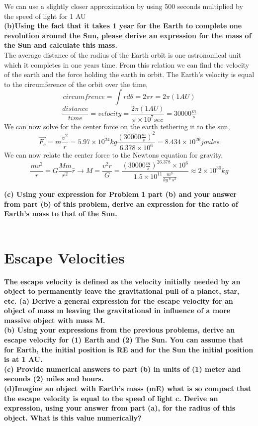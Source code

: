 \documentclass[paper=a4, fontsize=11pt]{scrartcl} %
\numberwithin{equation}{section} %
\numberwithin{figure}{section} %
\numberwithin{table}{section} %
\begin{document}
We can use a slightly closer approximation by using 500 seconds multiplied by the speed of light for 1 AU\\

\textbf{(b)Using the fact that it takes 1 year for the Earth to complete one revolution around
the Sun, please derive an expression for the mass of the Sun and calculate this mass.}\\

The average distance of the radius of the Earth orbit is one astronomical unit which it completes in one years time. From this relation we can find the velocity of the earth and the force holding the earth in orbit.
The Earth's velocity is equal to the circumference of the orbit over the time,
\begin{equation*}
circumfrence = \int rd\theta = 2\pi r = 2\pi (1AU)
\end{equation*}
\begin{equation*}
\frac{distance}{time}= velocity =\frac{2\pi (1AU)}{\pi \times 10^7 sec} = 30000\tfrac{m}{s}
\end{equation*}
We can now solve for the center force on the earth tethering it to the sun,
\begin{equation*}
\vec{F_c} = m\frac{v^2}{r} =  5.97\times 10^24 kg \frac{(30000\tfrac{m}{s})^2}{6.378\times 10^6} = 8.434\times 10^{26} joules
\end{equation*}
We can now relate the center force to the Newtons equation for gravity,
\begin{equation*}
\frac{mv^2}{r} = G\frac{Mm}{r^2}\hat{r} \rightarrow M = \frac{v^2r}{G} = \frac{(30000\tfrac{m}{s})^26.378\times 10^6}{1.5\times 10^{11}\tfrac{m^3}{kg*s^2} } \approx 2\times 10^{30}kg
\end{equation*}

\textbf{(c) Using your expression for Problem 1 part (b) and your answer from part (b) of this
problem, derive an expression for the ratio of Earth's mass to that of the Sun.}\\
\\
\section{Escape Velocities}
\textbf{The escape velocity is defined as the velocity initially needed by an object to permanently
leave the gravitational pull of a planet, star, etc.
(a) Derive a general expression for the escape velocity for an object of mass m leaving
the gravitational in
influence of a more massive object with mass M.}\\
\textbf{
(b) Using your expressions from the previous problems, derive an escape velocity for (1)
Earth and (2) The Sun. You can assume that for Earth, the initial position is RE and for
the Sun the initial position is at 1 AU.}\\
\textbf{(c) Provide numerical answers to part (b) in units of (1) meter and seconds (2) miles and
hours.}\\
\textbf{(d)Imagine an object with Earth's mass (mE) what is so compact that the escape velocity
is equal to the speed of light c. Derive an expression, using your answer from part (a), for
the radius of this object. What is this value numerically?}
\end{document}
